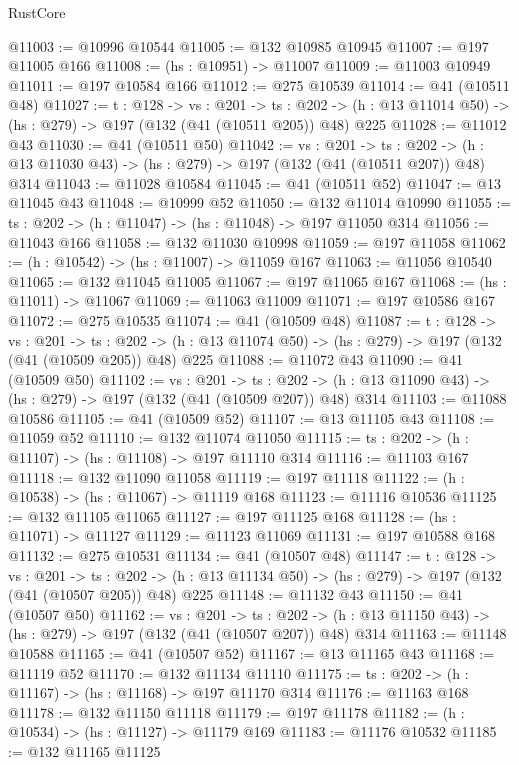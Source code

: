 \begin{lexlean}{RustCore}
\begin{coremodule}
@11003 := @10996 @10544
@11005 := @132 @10985 @10945
@11007 := @197 @11005 @166
@11008 := (hs : @10951) -> @11007
@11009 := @11003 @10949
@11011 := @197 @10584 @166
@11012 := @275 @10539
@11014 := @41 (@10511 @48)
@11027 := {t : @128} ->
  {vs : @201} ->
  {ts : @202} -> (h : @13 @11014 @50) -> (hs : @279) -> @197 (@132 (@41 (@10511 @205)) @48) @225
@11028 := @11012 @43
@11030 := @41 (@10511 @50)
@11042 := {vs : @201} ->
  {ts : @202} -> (h : @13 @11030 @43) -> (hs : @279) -> @197 (@132 (@41 (@10511 @207)) @48) @314
@11043 := @11028 @10584
@11045 := @41 (@10511 @52)
@11047 := @13 @11045 @43
@11048 := @10999 @52
@11050 := @132 @11014 @10990
@11055 := {ts : @202} -> (h : @11047) -> (hs : @11048) -> @197 @11050 @314
@11056 := @11043 @166
@11058 := @132 @11030 @10998
@11059 := @197 @11058
@11062 := (h : @10542) -> (hs : @11007) -> @11059 @167
@11063 := @11056 @10540
@11065 := @132 @11045 @11005
@11067 := @197 @11065 @167
@11068 := (hs : @11011) -> @11067
@11069 := @11063 @11009
@11071 := @197 @10586 @167
@11072 := @275 @10535
@11074 := @41 (@10509 @48)
@11087 := {t : @128} ->
  {vs : @201} ->
  {ts : @202} -> (h : @13 @11074 @50) -> (hs : @279) -> @197 (@132 (@41 (@10509 @205)) @48) @225
@11088 := @11072 @43
@11090 := @41 (@10509 @50)
@11102 := {vs : @201} ->
  {ts : @202} -> (h : @13 @11090 @43) -> (hs : @279) -> @197 (@132 (@41 (@10509 @207)) @48) @314
@11103 := @11088 @10586
@11105 := @41 (@10509 @52)
@11107 := @13 @11105 @43
@11108 := @11059 @52
@11110 := @132 @11074 @11050
@11115 := {ts : @202} -> (h : @11107) -> (hs : @11108) -> @197 @11110 @314
@11116 := @11103 @167
@11118 := @132 @11090 @11058
@11119 := @197 @11118
@11122 := (h : @10538) -> (hs : @11067) -> @11119 @168
@11123 := @11116 @10536
@11125 := @132 @11105 @11065
@11127 := @197 @11125 @168
@11128 := (hs : @11071) -> @11127
@11129 := @11123 @11069
@11131 := @197 @10588 @168
@11132 := @275 @10531
@11134 := @41 (@10507 @48)
@11147 := {t : @128} ->
  {vs : @201} ->
  {ts : @202} -> (h : @13 @11134 @50) -> (hs : @279) -> @197 (@132 (@41 (@10507 @205)) @48) @225
@11148 := @11132 @43
@11150 := @41 (@10507 @50)
@11162 := {vs : @201} ->
  {ts : @202} -> (h : @13 @11150 @43) -> (hs : @279) -> @197 (@132 (@41 (@10507 @207)) @48) @314
@11163 := @11148 @10588
@11165 := @41 (@10507 @52)
@11167 := @13 @11165 @43
@11168 := @11119 @52
@11170 := @132 @11134 @11110
@11175 := {ts : @202} -> (h : @11167) -> (hs : @11168) -> @197 @11170 @314
@11176 := @11163 @168
@11178 := @132 @11150 @11118
@11179 := @197 @11178
@11182 := (h : @10534) -> (hs : @11127) -> @11179 @169
@11183 := @11176 @10532
@11185 := @132 @11165 @11125

\end{coremodule}
\end{lexlean}
